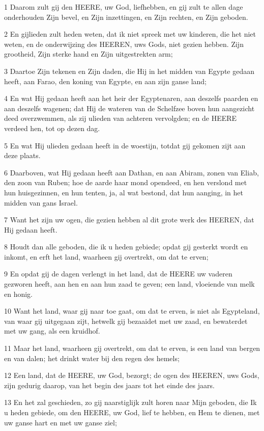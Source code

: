 \par 1 Daarom zult gij den HEERE, uw God, liefhebben, en gij zult te allen dage onderhouden Zijn bevel, en Zijn inzettingen, en Zijn rechten, en Zijn geboden.
\par 2 En gijlieden zult heden weten, dat ik niet spreek met uw kinderen, die het niet weten, en de onderwijzing des HEEREN, uws Gods, niet gezien hebben. Zijn grootheid, Zijn sterke hand en Zijn uitgestrekten arm;
\par 3 Daartoe Zijn tekenen en Zijn daden, die Hij in het midden van Egypte gedaan heeft, aan Farao, den koning van Egypte, en aan zijn ganse land;
\par 4 En wat Hij gedaan heeft aan het heir der Egyptenaren, aan deszelfs paarden en aan deszelfs wagenen; dat Hij de wateren van de Schelfzee boven hun aangezicht deed overzwemmen, als zij ulieden van achteren vervolgden; en de HEERE verdeed hen, tot op dezen dag.
\par 5 En wat Hij ulieden gedaan heeft in de woestijn, totdat gij gekomen zijt aan deze plaats.
\par 6 Daarboven, wat Hij gedaan heeft aan Dathan, en aan Abiram, zonen van Eliab, den zoon van Ruben; hoe de aarde haar mond opendeed, en hen verslond met hun huisgezinnen, en hun tenten, ja, al wat bestond, dat hun aanging, in het midden van gans Israel.
\par 7 Want het zijn uw ogen, die gezien hebben al dit grote werk des HEEREN, dat Hij gedaan heeft.
\par 8 Houdt dan alle geboden, die ik u heden gebiede; opdat gij gesterkt wordt en inkomt, en erft het land, waarheen gij overtrekt, om dat te erven;
\par 9 En opdat gij de dagen verlengt in het land, dat de HEERE uw vaderen gezworen heeft, aan hen en aan hun zaad te geven; een land, vloeiende van melk en honig.
\par 10 Want het land, waar gij naar toe gaat, om dat te erven, is niet als Egypteland, van waar gij uitgegaan zijt, hetwelk gij bezaaidet met uw zaad, en bewaterdet met uw gang, als een kruidhof.
\par 11 Maar het land, waarheen gij overtrekt, om dat te erven, is een land van bergen en van dalen; het drinkt water bij den regen des hemels;
\par 12 Een land, dat de HEERE, uw God, bezorgt; de ogen des HEEREN, uws Gods, zijn gedurig daarop, van het begin des jaars tot het einde des jaars.
\par 13 En het zal geschieden, zo gij naarstiglijk zult horen naar Mijn geboden, die Ik u heden gebiede, om den HEERE, uw God, lief te hebben, en Hem te dienen, met uw ganse hart en met uw ganse ziel;
